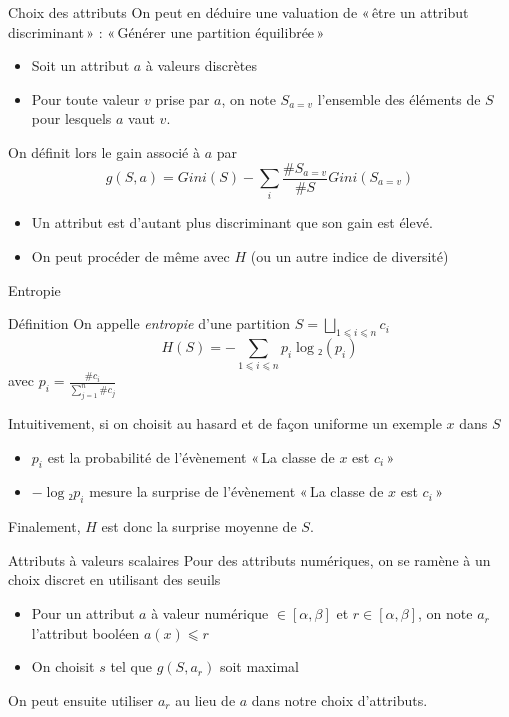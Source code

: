 \documentclass[xcolor={svgnames}, french]{beamer}
\begin{document}
\begin{frame}{Choix des attributs}
    On peut en déduire une valuation de « être un attribut discriminant » : « Générer une partition équilibrée »
    \begin{itemize}
         \item Soit un attribut $a$ à valeurs discrètes
         \item Pour toute valeur $v$ prise par $a$, on note $S_{a=v}$ l'ensemble des éléments de $S$ pour lesquels $a$ vaut $v$.
    \end{itemize}
    On définit lors le gain associé à $a$ par
    \begin{equation}
        g(S, a) = Gini(S) - ∑_i\frac{\#S_{a=v}}{\#S}Gini(S_{a=v})
    \end{equation}
    \begin{itemize}
        \item Un attribut est d'autant plus discriminant que son gain est élevé.
        \item On peut procéder de même avec $H$ (ou un autre indice de diversité)
    \end{itemize}
\end{frame}

\begin{frame}{Entropie}
    \begin{block}{Définition}
        On appelle \emph{entropie} d'une partition $S=⨆_{1⩽i⩽n}c_i$
        \begin{equation}
            H(S) = -∑_{1⩽i⩽n}p_i\log₂(p_i)
        \end{equation}
        avec $p_i=\frac{\#c_i}{∑_{j=1}^n\#c_j}$
    \end{block}
    Intuitivement, si on choisit au hasard et de façon uniforme un exemple $x$ dans $S$
    \begin{itemize}
        \item $p_i$ est la probabilité de l'évènement « La classe de $x$ est $c_i$ »
        \item $-\log₂p_i$ mesure la surprise de l'évènement « La classe de $x$ est $c_i$ »
    \end{itemize}
    Finalement, $H$ est donc la surprise moyenne de $S$.
\end{frame}

\begin{frame}{Attributs à valeurs scalaires}
    Pour des attributs numériques, on se ramène à un choix discret en utilisant des seuils
    \begin{itemize}
        \item Pour un attribut $a$ à valeur numérique $∈[α, β]$ et $r∈[α, β]$, on note $a_r$ l'attribut booléen $a(x)⩽r$
        \item On choisit $s$ tel que $g(S, a_r)$ soit maximal
    \end{itemize}
    On peut ensuite utiliser $a_r$ au lieu de $a$ dans notre choix d'attributs.
\end{frame}
\end{document}

